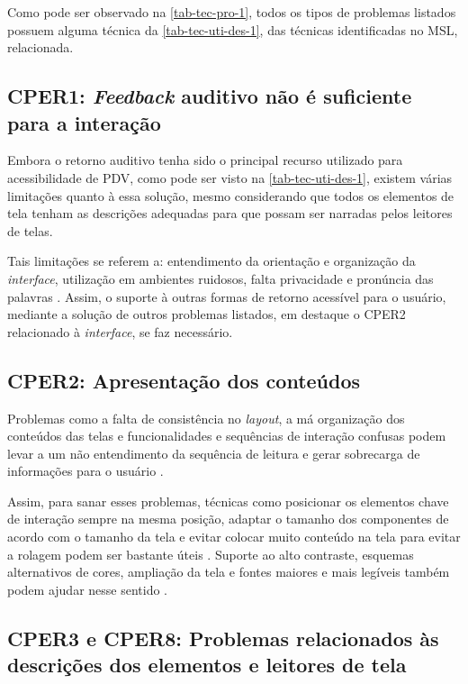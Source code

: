 \newpage

Como pode ser observado na \autoref{tab-tec-pro-1}, todos os tipos de problemas listados possuem alguma
técnica da \autoref{tab-tec-uti-des-1}, das técnicas identificadas no MSL, relacionada.

\subsection{CPER1: \emph{Feedback} auditivo não é suficiente para a interação}

Embora o retorno auditivo tenha sido o principal recurso utilizado para acessibilidade de PDV, como pode
ser visto na \autoref{tab-tec-uti-des-1}, existem várias limitações quanto à essa solução, mesmo considerando
que todos os elementos de tela tenham as descrições adequadas para que possam ser narradas pelos leitores de
telas.

Tais limitações se referem a: entendimento da orientação e organização da \emph{interface}, utilização
em ambientes ruidosos, falta privacidade e pronúncia das palavras \cite{Damaceno2016}.
Assim, o suporte à outras formas de retorno acessível para o usuário, mediante a solução de outros problemas
listados, em destaque o CPER2 relacionado à \emph{interface}, se faz necessário.

\subsection{CPER2: Apresentação dos conteúdos}

Problemas como a falta de consistência no \emph{layout}, a má organização dos conteúdos das telas e
funcionalidades e sequências de interação confusas podem levar a um não entendimento
da sequência de leitura e gerar sobrecarga de informações para o usuário \cite{Shera2021285, Christoph2020}.

Assim, para sanar esses problemas, técnicas como posicionar os elementos chave de interação sempre na mesma posição,
adaptar o tamanho dos componentes de acordo com o tamanho da tela e evitar colocar muito conteúdo na tela para evitar
a rolagem podem ser bastante úteis \cite{Mascetti2019,Ducci2018}. Suporte ao alto contraste,
esquemas alternativos de cores, ampliação da tela e fontes maiores e mais legíveis também podem ajudar nesse sentido
\cite{Kim20191103,Oliveira2019}.

\subsection{CPER3 e CPER8: Problemas relacionados às descrições dos elementos e leitores de tela}

